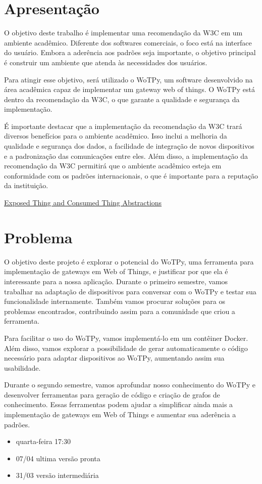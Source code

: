 
\section{Apresentação}

O objetivo deste trabalho é implementar uma recomendação da W3C em um ambiente acadêmico. Diferente dos softwares comerciais, o foco está na interface do usuário. Embora a aderência aos padrões seja importante, o objetivo principal é construir um ambiente que atenda às necessidades dos usuários.

Para atingir esse objetivo, será utilizado o WoTPy, um software desenvolvido na área acadêmica capaz de implementar um gateway web of things. O WoTPy está dentro da recomendação da W3C, o que garante a qualidade e segurança da implementação.

É importante destacar que a implementação da recomendação da W3C trará diversos benefícios para o ambiente acadêmico. Isso inclui a melhoria da qualidade e segurança dos dados, a facilidade de integração de novos dispositivos e a padronização das comunicações entre eles. Além disso, a implementação da recomendação da W3C permitirá que o ambiente acadêmico esteja em conformidade com os padrões internacionais, o que é importante para a reputação da instituição.

\href{https://www.w3.org/TR/wot-architecture11/#expose-consumed-thing}{Exposed Thing and Consumed Thing Abstractions}

\section{Problema}

O objetivo deste projeto é explorar o potencial do WoTPy, uma ferramenta para implementação de gateways em Web of Things, e justificar por que ela é interessante para a nossa aplicação. Durante o primeiro semestre, vamos trabalhar na adaptação de dispositivos para conversar com o WoTPy e testar sua funcionalidade internamente. Também vamos procurar soluções para os problemas encontrados, contribuindo assim para a comunidade que criou a ferramenta.

Para facilitar o uso do WoTPy, vamos implementá-lo em um contêiner Docker. Além disso, vamos explorar a possibilidade de gerar automaticamente o código necessário para adaptar dispositivos ao WoTPy, aumentando assim sua usabilidade.

Durante o segundo semestre, vamos aprofundar nosso conhecimento do WoTPy e desenvolver ferramentas para geração de código e criação de grafos de conhecimento. Essas ferramentas podem ajudar a simplificar ainda mais a implementação de gateways em Web of Things e aumentar sua aderência a padrões.

\begin{itemize}
    \item quarta-feira 17:30
    \item 07/04 ultima versão pronta 
    \item 31/03 versão intermediária
\end{itemize}

